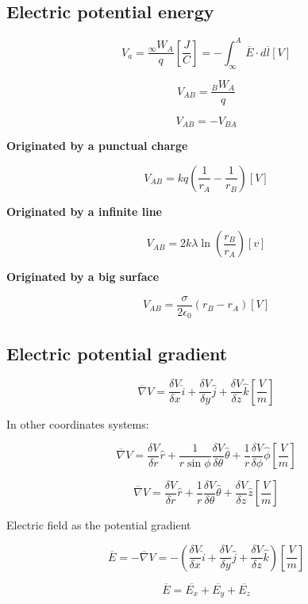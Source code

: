 \documentclass[letterpaper]{article}
\newcommand{\divline}{\noindent\makebox[\linewidth]{\rule{\textwidth}{0.4pt}}}
\begin{document}
    \divline
    \begin{multicols}{3}
        \section{Electric potential energy}

        \[V_{a} = \frac{_{\infty} W_{A}}{q} \left[ \frac{J}{C} \right] = - \int_{\infty}^{A} \overline{E} \cdot d \overline{l} \left[ V \right] \]

        \[V_{AB} = \frac{_{B} W_{A}}{q}\]

        \[V_{AB} = - V_{BA}\]

        \textbf{Originated by a punctual charge}

        \[V_{AB} = kq \left( \frac{1}{r_{A}} - \frac{1}{r_{B}} \right) [V]\]

        \textbf{Originated by a infinite line}

        \[V_{AB} = 2k\lambda \ln \left( \frac{r_{B}}{r_{A}} \right) [v]\]

        \textbf{Originated by a big surface}

        \[V_{AB} = \frac{\sigma}{2 \epsilon_{0}} (r_{B} - r_{A}) [V]\]
    \end{multicols}

    \divline
    \begin{multicols}{2}
        \section{Electric potential gradient}

        \[\overline{\nabla} V = \frac{\delta V}{\delta x} \hat{i} + \frac{\delta V}{\delta y} \hat{j} + \frac{\delta V}{\delta z} \hat{k} \left[ \frac{V}{m} \right] \]

        In other coordinates systems:

        \[\overline{\nabla} V = \frac{\delta V}{\delta r} \hat{r} + \frac{1}{r \sin{\phi}} \frac{\delta V}{\delta \theta} \hat{\theta} + \frac{1}{r} \frac{\delta V}{\delta \phi} \hat{\phi} \left[ \frac{V}{m} \right] \]

        \[\overline{\nabla} V = \frac{\delta V}{\delta r} \hat{r} + \frac{1}{r} \frac{\delta V}{\delta \theta} \hat{\theta} + \frac{\delta V}{\delta z} \hat{z} \left[ \frac{V}{m} \right] \]

        Electric field as the potential gradient

        \[\overline{E} =   - \overline{\nabla} V =  - \left( \frac{\delta V}{\delta x} \hat{i} + \frac{\delta V}{\delta y} \hat{j} + \frac{\delta V}{\delta z} \hat{k} \right) \left[ \frac{V}{m} \right] \]

        \[\overline{E} = \overline{E_{x}} + \overline{E_{y}} + \overline{E_{z}} \]
        
    \end{multicols}
\end{document}
